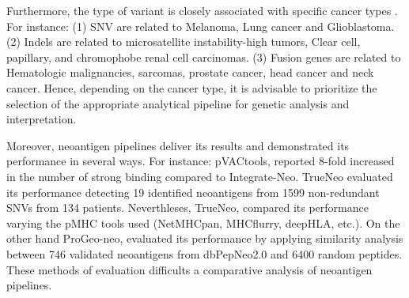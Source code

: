 Furthermore, the type of variant  is closely associated with specific cancer types \cite{wang2021gene}. For instance: (1) SNV are related to Melanoma, Lung cancer and Glioblastoma. (2) Indels are related to microsatellite instability-high tumors, Clear cell, papillary, and chromophobe renal cell carcinomas. (3) Fusion genes are related to Hematologic malignancies,  sarcomas, prostate cancer, head cancer and neck cancer. Hence, depending on the cancer type, it is advisable to prioritize the selection of the appropriate analytical pipeline for genetic analysis and interpretation.

Moreover, neoantigen pipelines deliver its results and demonstrated its performance in several ways. For instance: pVACtools, reported 8-fold increased in the number of strong binding compared to Integrate-Neo. TrueNeo evaluated its performance detecting 19 identified neoantigens from 1599 non-redundant SNVs from 134 patients. Neverthleses, TrueNeo, compared its performance varying the pMHC tools used (NetMHCpan, MHCflurry, deepHLA, etc.). On the other hand ProGeo-neo, evaluated its performance by applying similarity analysis between 746 validated neoantigens from dbPepNeo2.0 and 6400 random peptides. These methods of evaluation difficults a comparative analysis of neoantigen pipelines.



